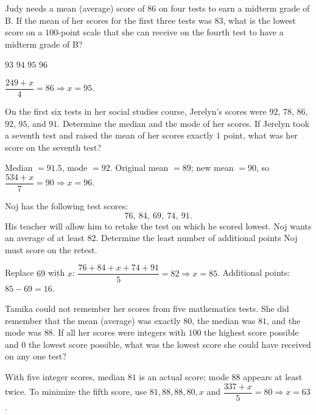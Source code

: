 \question[5]
Judy needs a mean (average) score of $86$ on four tests to earn a midterm grade of B. If the mean of her scores for the first three tests was $83$, what is the lowest score on a $100$-point scale that she can receive on the fourth test to have a midterm grade of B?
\begin{choices}
  \choice $93$
  \choice $94$
  \CorrectChoice $95$
  \choice $96$
\end{choices}
\begin{solution}
  $\dfrac{249+x}{4}=86\Rightarrow x=95$.
\end{solution}

\question[10]
On the first six tests in her social studies course, Jerelyn's scores were $92$, $78$, $86$, $92$, $95$, and $91$. Determine the median and the mode of her scores. If Jerelyn took a seventh test and raised the mean of her scores exactly $1$ point, what was her score on the seventh test?
\begin{solutionorbox}[2in]
  Median $=91.5$, mode $=92$. Original mean $=89$; new mean $=90$, so $\dfrac{534+x}{7}=90\Rightarrow x=96$.
\end{solutionorbox}


\newpage



\question[10]
Noj has the following test scores:
\[
  76,\ 84,\ 69,\ 74,\ 91\text{.}
\]
His teacher will allow him to retake the test on which he scored lowest. Noj wants an average of at least $82$. Determine the least number of additional points Noj must score on the retest.
\begin{solutionorbox}[1.6in]
  Replace $69$ with $x$: $\dfrac{76+84+x+74+91}{5}=82\Rightarrow x=85$. Additional points: $85-69=16$.
\end{solutionorbox}

\question[10]
Tamika could not remember her scores from five mathematics tests. She did remember that the mean (average) was exactly $80$, the median was $81$, and the mode was $88$. If all her scores were integers with $100$ the highest score possible and $0$ the lowest score possible, what was the lowest score she could have received on any one test?
\begin{solutionorbox}[2in]
  With five integer scores, median $81$ is an actual score; mode $88$ appears at least twice. To minimize the fifth score, use $81,88,88,80,x$ and $\dfrac{337+x}{5}=80\Rightarrow x=63$.
\end{solutionorbox}


\newpage



